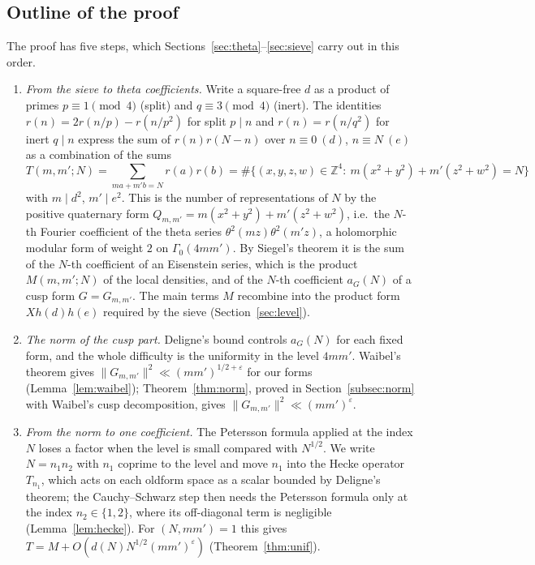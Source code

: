 \documentclass[11pt]{amsart}
\theoremstyle{remark}
\newcommand{\Z}{\mathbb{Z}}
\newcommand{\e}{\varepsilon}
\begin{document}
\subsection*{Outline of the proof}
The proof has five steps, which Sections~\ref{sec:theta}--\ref{sec:sieve} carry out in this order.
\begin{enumerate}[label=\textup{(\arabic*)},leftmargin=2.2em]
\item \emph{From the sieve to theta coefficients.} Write a square-free $d$ as a product of primes $p\equiv1\pmod4$ (split) and $q\equiv 3\pmod 4$ (inert). The identities $r(n)=2r(n/p)-r(n/p^2)$ for split $p\mid n$ and $r(n)=r(n/q^2)$ for inert $q\mid n$ express the sum of $r(n)r(N-n)$ over $n\equiv0\ (d)$, $n\equiv N\ (e)$ as a combination of the sums
\begin{equation}\label{eq:T}
T(m,m';N)=\sum_{ma+m'b=N}r(a)r(b)=\#\{(x,y,z,w)\in\Z^4:\ m(x^2+y^2)+m'(z^2+w^2)=N\}
\end{equation}
with $m\mid d^2$, $m'\mid e^2$. This is the number of representations of $N$ by the positive quaternary form $Q_{m,m'}=m(x^2+y^2)+m'(z^2+w^2)$, i.e.\ the $N$-th Fourier coefficient of the theta series $\theta^2(mz)\theta^2(m'z)$, a holomorphic modular form of weight $2$ on $\Gamma_0(4mm')$. By Siegel's theorem it is the sum of the $N$-th coefficient of an Eisenstein series, which is the product $M(m,m';N)$ of the local densities, and of the $N$-th coefficient $a_G(N)$ of a cusp form $G=G_{m,m'}$. The main terms $M$ recombine into the product form $Xh(d)h(e)$ required by the sieve (Section~\ref{sec:level}).
\item \emph{The norm of the cusp part.} Deligne's bound controls $a_G(N)$ for each fixed form, and the whole difficulty is the uniformity in the level $4mm'$. Waibel's theorem \cite{Waibel} gives $\|G_{m,m'}\|^2\ll(mm')^{1/2+\e}$ for our forms (Lemma~\ref{lem:waibel}); Theorem~\ref{thm:norm}, proved in Section~\ref{subsec:norm} with Waibel's cusp decomposition, gives $\|G_{m,m'}\|^2\ll(mm')^{\e}$.
\item \emph{From the norm to one coefficient.} The Petersson formula applied at the index $N$ loses a factor when the level is small compared with $N^{1/2}$. We write $N=n_1n_2$ with $n_1$ coprime to the level and move $n_1$ into the Hecke operator $T_{n_1}$, which acts on each oldform space as a scalar bounded by Deligne's theorem; the Cauchy--Schwarz step then needs the Petersson formula only at the index $n_2\in\{1,2\}$, where its off-diagonal term is negligible (Lemma~\ref{lem:hecke}). For $(N,mm')=1$ this gives $T=M+O(d(N)N^{1/2}(mm')^{\e})$ (Theorem~\ref{thm:unif}).

\end{enumerate}
\end{document}
